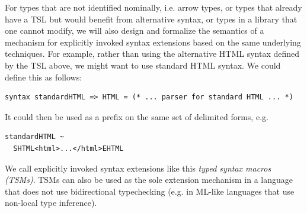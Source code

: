 \begin{contribution}\label{cont:TSMs}
For types that are not identified nominally, i.e. arrow types, or types that already have a TSL but would benefit from alternative syntax, or types in a library that one cannot modify, we will also design and formalize the semantics of a mechanism for explicitly invoked syntax extensions based on the same underlying techniques. For example, rather than using the alternative HTML syntax defined by the TSL above, we might want to use standard HTML syntax. We could define this as follows:

\begin{lstlisting}[numbers=none]
syntax standardHTML => HTML = (* ... parser for standard HTML ... *)
\end{lstlisting}
It could then be used as a prefix on the same set of delimited forms, e.g. 
\begin{lstlisting}[numbers=none]
standardHTML ~
  SHTML<html>...</html>EHTML
\end{lstlisting}

We call explicitly invoked syntax extensions like this \emph{typed syntax macros (TSMs)}. TSMs can also be used as the sole extension mechanism in a language that does not use bidirectional typechecking (e.g. in ML-like languages that use non-local type inference).
\end{contribution}

